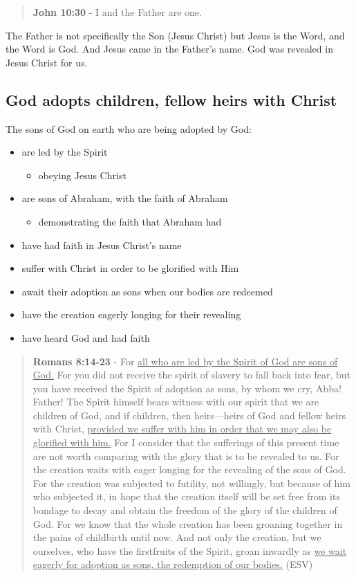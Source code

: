 \documentclass[11pt]{article}
\begin{document}
\begin{quote}
\textbf{John 10:30} - I and the Father are one.
\end{quote}

The Father is not specifically the Son (Jesus Christ) but Jesus is the Word, and the Word is God.
And Jesus came in the Father's name. God was revealed in Jesus Christ for us.

\subsection{God adopts children, fellow heirs with Christ}
\label{sec:org1c7f96c}
The sons of God on earth who are being adopted by God:
\begin{itemize}
\item are led by the Spirit
\begin{itemize}
\item obeying Jesus Christ
\end{itemize}
\item are sons of Abraham, with the faith of Abraham
\begin{itemize}
\item demonstrating the faith that Abraham had
\end{itemize}
\item have had faith in Jesus Christ's name
\item suffer with Christ in order to be glorified with Him
\item await their adoption as sons when our bodies are redeemed
\item have the creation eagerly longing for their revealing
\item have heard God and had faith
\end{itemize}

\begin{quote}
\textbf{Romans 8:14-23} - For \uline{all who are led by the Spirit of God are sons of God.} For you did not receive the spirit of slavery to fall back into fear, but you have received the Spirit of adoption as sons, by whom we cry, Abba! Father! The Spirit himself bears witness with our spirit that we are children of God, and if children, then heirs—heirs of God and fellow heirs with Christ, \uline{provided we suffer with him in order that we may also be glorified with him.} For I consider that the sufferings of this present time are not worth comparing with the glory that is to be revealed to us. For the creation waits with eager longing for the revealing of the sons of God. For the creation was subjected to futility, not willingly, but because of him who subjected it, in hope that the creation itself will be set free from its bondage to decay and obtain the freedom of the glory of the children of God. For we know that the whole creation has been groaning together in the pains of childbirth until now. And not only the creation, but we ourselves, who have the firstfruits of the Spirit, groan inwardly as \uline{we wait eagerly for adoption as sons, the redemption of our bodies.} (ESV)
\end{quote}
\end{document}
